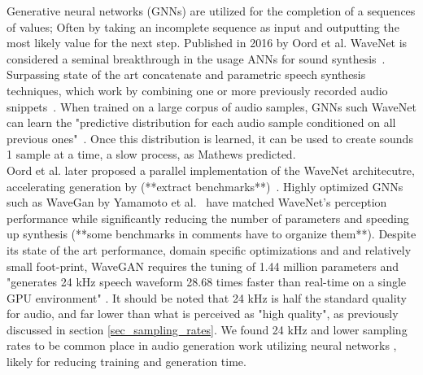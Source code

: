 \documentclass[\main/thesis.tex]{subfiles}
\begin{document}
Generative neural networks (GNNs) are utilized for the completion of a sequences of values; Often by taking an incomplete sequence as input and outputting the most likely value for the next step. Published in 2016 by Oord et al. WaveNet is considered a seminal breakthrough in the usage ANNs for sound synthesis~\cite{oord2016wavenet}. Surpassing state of the art concatenate and parametric speech synthesis techniques, which work by combining one or more previously recorded audio snippets~\cite{schwarz2007corpus}. When trained on a large corpus of audio samples, GNNs such WaveNet can learn the "predictive distribution for each
audio sample conditioned on all previous ones"~\cite{oord2016wavenet}. Once this distribution is learned, it can be used to create sounds 1 sample at a time, a slow process, as Mathews predicted. \\
Oord et al. later proposed a parallel implementation of the WaveNet architecutre, accelerating generation by (**extract benchmarks**)~\cite{oord2017parallel}. Highly optimized GNNs such as WaveGan by Yamamoto et al.~\cite{yamamoto2020parallel} have matched WaveNet's perception performance while significantly reducing the number of parameters and speeding up synthesis (**some benchmarks in comments have to organize them**). Despite its state of the art performance, domain specific optimizations and and relatively small foot-print, WaveGAN requires the tuning of 1.44 million parameters and "generates 24 kHz speech waveform 28.68 times faster than real-time on a single GPU environment" \cite{yamamoto2020parallel}. It should be noted that 24 kHz is half the standard quality for audio, and far lower than what is perceived as "high quality", as previously discussed in section \ref{sec_sampling_rates}. We found 24 kHz and lower sampling rates to be common place in audio generation work utilizing neural networks \cite{oord2017parallel,yamamoto2019parallel,aouameur2019neural,ramires2020neural}, likely for reducing training and generation time. 


\end{document}
